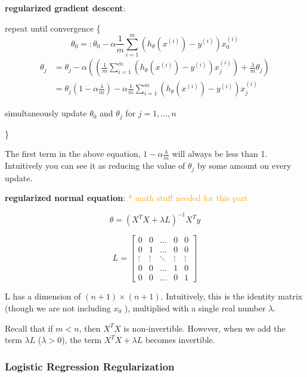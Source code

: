 \documentclass{article}
\begin{document}
\noindent \textbf{regularized gradient descent}:

\noindent repeat until convergence \{
\[\theta_0 =: \theta_0 - \alpha \frac{1}{m} \sum_{i = 1}^m (h_{\theta}(x^{(i)}) - y^{(i)}) x^{(i)}_0\]
\begin{equation*}
\begin{split}
\theta_j & = \theta_j - \alpha ((\frac{1}{m} \sum_{i = 1}^m (h_{\theta}(x^{(i)}) - y^{(i)}) x^{(i)}_j) + \frac{\lambda}{m} \theta_j) \\
 & = \theta_j (1 - \alpha \frac{\lambda}{m}) - \alpha \frac{1}{m} \sum_{i = 1}^m (h_{\theta}(x^{(i)}) - y^{(i)}) x^{(i)}_j
\end{split}
\end{equation*}

\centerline{simultaneously update \(\theta_0\) and \(\theta_j\) for \(j = 1, \dots, n\)}
\}

\bigskip

\noindent The first term in the above equation, \(1 - \alpha \frac{\lambda}{m}\) will always be less than 1. Intuitively you can see it as reducing the value of \(\theta_j\) by some amount on every update.

\bigskip

\noindent \textbf{regularized normal equation}: \textcolor{orange}{ * math stuff needed for this part}

\[
\theta = (X^TX + \lambda L)^{-1}X^Ty
\]

\[
L = 
\begin{bmatrix}
0 & 0 & \dots & 0 & 0\\
0 & 1 & \dots & 0 & 0\\
\vdots & \vdots & \ddots & \vdots & \vdots\\
0 & 0 & \dots & 1 & 0\\
0 & 0 & \dots & 0 & 1
\end{bmatrix}
\]

\bigskip

\noindent L has a dimension of \((n + 1) \times (n + 1)\). Intuitively, this is the identity matrix (though we are not including \(x_0\) ), multiplied with a single real number \(\lambda\).

\bigskip

\noindent Recall that if \(m < n\), then \(X^TX\) is non-invertible. However, when we add the term \(\lambda L\) (\(\lambda > 0\)), the term \(X^TX + \lambda L\) becomes invertible.

\subsubsection{Logistic Regression Regularization}
\end{document}
